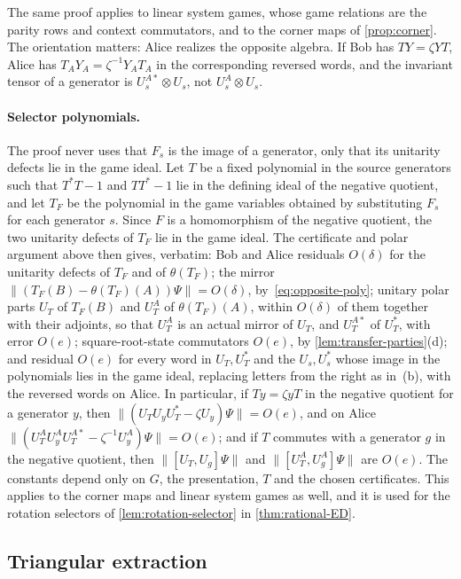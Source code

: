 The same proof applies to linear system games, whose game relations are the parity rows and context commutators, and to
the corner maps of \cref{prop:corner}. The orientation matters: Alice realizes the opposite algebra. If Bob has
$TY=\zeta YT$, Alice has $T_AY_A=\zeta^{-1}Y_AT_A$ in the corresponding reversed words, and the invariant tensor of a
generator is $U_s^{A*}\otimes U_s$, not $U_s^A\otimes U_s$.

\paragraph{Selector polynomials.} The proof never uses that $F_s$ is the image of a generator, only that its unitarity defects lie in
the game ideal. Let $T$ be a fixed polynomial in the source generators such that $T^*T-1$ and $TT^*-1$ lie in the defining ideal of
the negative quotient, and let $T_F$ be the polynomial in the game variables obtained by substituting $F_s$ for each generator $s$.
Since $F$ is a homomorphism of the negative quotient, the two unitarity defects of $T_F$ lie in the game ideal. The certificate and
polar argument above then gives, verbatim: Bob and Alice residuals $O(\delta)$ for the unitarity defects of $T_F$ and of $\theta(T_F)$;
the mirror $\|(T_F(B)-\theta(T_F)(A))\Psi\|=O(\delta)$, by~\eqref{eq:opposite-poly}; unitary polar parts $U_T$ of $T_F(B)$ and $U_T^A$
of $\theta(T_F)(A)$, within $O(\delta)$ of them together with their adjoints, so that $U_T^A$ is an actual mirror of $U_T$, and
$U_T^{A*}$ of $U_T^*$, with error $O(e)$; square-root-state commutators $O(e)$, by \cref{lem:transfer-parties}(d); and residual
$O(e)$ for every word in $U_T,U_T^*$ and the $U_s,U_s^*$ whose image in the polynomials lies in the game ideal, replacing letters from
the right as in~(b), with the reversed words on Alice. In particular, if $Ty=\zeta yT$ in the negative quotient for a generator $y$,
then $\|(U_TU_yU_T^*-\zeta U_y)\Psi\|=O(e)$, and on Alice $\|(U_T^AU_y^AU_T^{A*}-\zeta^{-1}U_y^A)\Psi\|=O(e)$; and if $T$ commutes with a
generator $g$ in the negative quotient, then $\|[U_T,U_g]\Psi\|$ and $\|[U_T^A,U_g^A]\Psi\|$ are $O(e)$. The constants depend only on
$G$, the presentation, $T$ and the chosen certificates. This applies to the corner maps and linear system games as well, and it is
used for the rotation selectors of \cref{lem:rotation-selector} in \cref{thm:rational-ED}.

\subsection{Triangular extraction}\label{sec:triangular}

